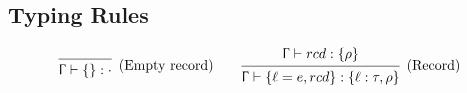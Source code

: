 \documentclass{article}
\newcommand{\rcd}[1]{\{#1\}}
\newcommand{\emptyrow}{\cdot}
\newcommand{\spc}{\qquad}
\newcommand{\ctx}{\Upgamma}
\newcommand{\derives}[3]{#1 \vdash #2 : #3}
\newcommand{\deduct}[3][]
{
  \begin{prooftree}
    \hypo{#2}
    \infer1[\text{#1}]{#3}
  \end{prooftree}
}
\begin{document}
\subsection{Typing Rules}

\[
  \deduct
  {}
  {\derives \ctx {\rcd{}} \emptyrow}
  {\text{(Empty record)}}
  \spc
  \deduct
  {\derives \ctx {rcd} {\rcd \rho}}
  {\derives \ctx {\rcd{\ell=e,rcd}} {\rcd{\ell : \tau, \rho}}}
  {\text{(Record)}}
\]
\end{document}
